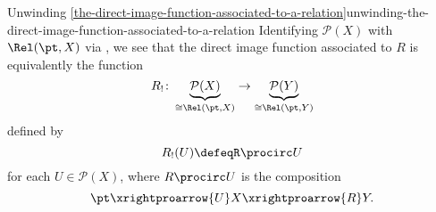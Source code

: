 \begin{remark}{Unwinding \cref{the-direct-image-function-associated-to-a-relation}}{unwinding-the-direct-image-function-associated-to-a-relation}%
    Identifying $\mathcal{P}(X)$ with $\Rel(\pt,X)$ via , we see that the direct image function associated to $R$ is equivalently the function
    \[
        R_{!}%
        \colon%
        \underbrace{\mathcal{P}(X)}_{\cong\Rel(\pt,X)}
        \to%
        \underbrace{\mathcal{P}(Y)}_{\cong\Rel(\pt,Y)}%
    \]%
    defined by
    \[
        R_{!}(U)%
        \defeq%
        R\procirc U%
    \]%
    for each $U\in\mathcal{P}(X)$, where $R\procirc U$ is the composition
    \[
        \pt%
        \xrightproarrow{U}%
        X%
        \xrightproarrow{R}%
        Y.
    \]%
\end{remark}
